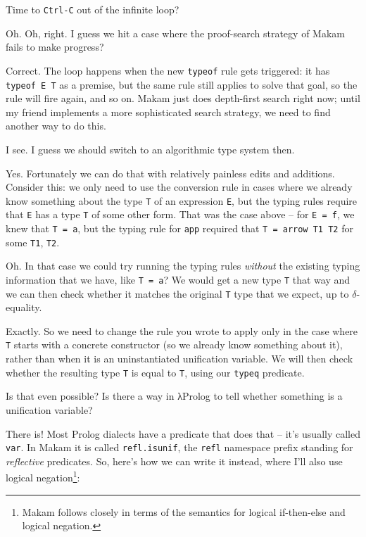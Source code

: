 \heroADVISOR{} Time to \texttt{Ctrl-C} out of the infinite loop?

\heroSTUDENT{} Oh. Oh, right. I guess we hit a case where the proof-search
strategy of Makam fails to make progress?

\heroADVISOR{} Correct. The loop happens when the new \texttt{typeof} rule
gets triggered: it has \texttt{typeof\ E\ T\textquotesingle{}} as a
premise, but the same rule still applies to solve that goal, so the rule
will fire again, and so on. Makam just does depth-first search right
now; until my friend implements a more sophisticated search strategy, we
need to find another way to do this.

\heroSTUDENT{} I see. I guess we should switch to an algorithmic type system
then.

\heroADVISOR{} Yes. Fortunately we can do that with relatively painless edits
and additions. Consider this: we only need to use the conversion rule in
cases where we already know something about the type \texttt{T} of an
expression \texttt{E}, but the typing rules require that \texttt{E} has
a type \texttt{T\textquotesingle{}} of some other form. That was the
case above -- for \texttt{E\ =\ f}, we knew that \texttt{T\ =\ a}, but
the typing rule for \texttt{app} required that
\texttt{T\textquotesingle{}\ =\ arrow\ T1\ T2} for some \texttt{T1},
\texttt{T2}.

\heroSTUDENT{} Oh. In that case we could try running the typing rules
\emph{without} the existing typing information that we have, like
\texttt{T\ =\ a}? We would get a new type \texttt{T\textquotesingle{}}
that way and we can then check whether it matches the original
\texttt{T} type that we expect, up to \(\delta\)-equality.

\heroADVISOR{} Exactly. So we need to change the rule you wrote to apply only
in the case where \texttt{T} starts with a concrete constructor (so we
already know something about it), rather than when it is an
uninstantiated unification variable. We will then check whether the
resulting type \texttt{T\textquotesingle{}} is equal to \texttt{T},
using our \texttt{typeq} predicate.

\heroSTUDENT{} Is that even possible? Is there a way in \foreignlanguage{greek}{λ}Prolog to tell
whether something is a unification variable?

\heroADVISOR{} There is! Most Prolog dialects have a predicate that does that
-- it's usually called \texttt{var}. In Makam it is called
\texttt{refl.isunif}, the \texttt{refl} namespace prefix standing for
\emph{reflective} predicates. So, here's how we can write it instead,
where I'll also use logical
negation\footnote{Makam follows \citet{kiselyov05backtracking} closely in terms of the semantics for logical if-then-else and logical negation.}:

